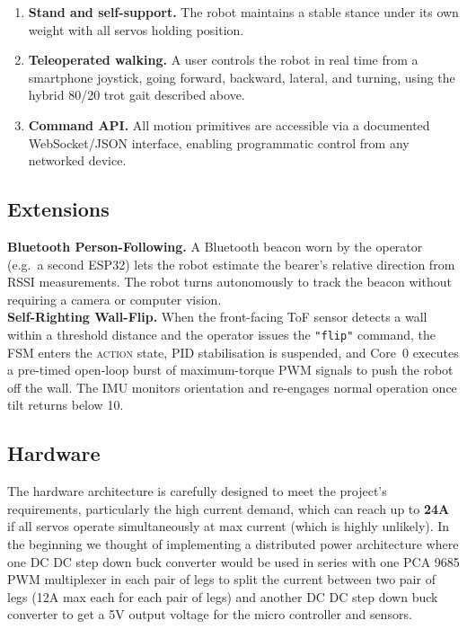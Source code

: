 \documentclass{article}
\begin{document}
\begin{enumerate}
  \item \textbf{Stand and self-support.} The robot maintains a stable stance under its own weight with all servos holding position.
  \item \textbf{Teleoperated walking.} A user controls the robot in real time from a smartphone joystick, going forward, backward, lateral, and turning, using the hybrid 80/20 trot gait described above.
  \item \textbf{Command API.} All motion primitives are accessible via a documented WebSocket/JSON interface, enabling programmatic control from any networked device.
\end{enumerate}

\subsection*{Extensions}

\textbf{Bluetooth Person-Following.} A Bluetooth beacon worn by the operator (e.g.\ a second ESP32) lets the robot estimate the bearer's relative direction from RSSI measurements. The robot turns autonomously to track the beacon without requiring a camera or computer vision. \\

\textbf{Self-Righting Wall-Flip.} When the front-facing ToF sensor detects a wall within a threshold distance and the operator issues the \texttt{"flip"} command, the FSM enters the \textsc{action} state, PID stabilisation is suspended, and Core~0 executes a pre-timed
open-loop burst of maximum-torque PWM signals to push the robot off the wall. The IMU monitors orientation and re-engages normal operation once tilt returns below
10\textdegree{}.


\subsection{Hardware}

The hardware architecture is carefully designed to meet the project’s requirements, particularly the high current demand, which can reach up to \textbf{24A} if all servos operate simultaneously at max current (which is highly unlikely). In the beginning we thought of implementing a distributed power architecture where one DC DC step down buck converter would be used in series with one PCA 9685 PWM multiplexer in each pair of legs to split the current between two pair of legs (12A max each for each pair of legs) and another DC DC step down buck converter to get a 5V output voltage for the micro controller and sensors.
\end{document}
